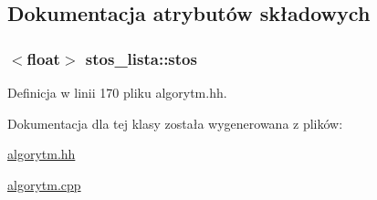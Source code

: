\subsection{\-Dokumentacja atrybutów składowych}
\hypertarget{classstos__lista_a94fc88e5b40c7a44e2e34a6f0441853f}{
\subsubsection[{stos}]{$<$float$>$ {\bf stos\-\_\-lista\-::stos}}}\label{classstos__lista_a94fc88e5b40c7a44e2e34a6f0441853f}


\-Definicja w linii 170 pliku algorytm.\-hh.



\-Dokumentacja dla tej klasy została wygenerowana z plików\-:\begin{DoxyCompactItemize}
\item 
\hyperlink{algorytm_8hh}{algorytm.\-hh}\item 
\hyperlink{algorytm_8cpp}{algorytm.\-cpp}\end{DoxyCompactItemize}
